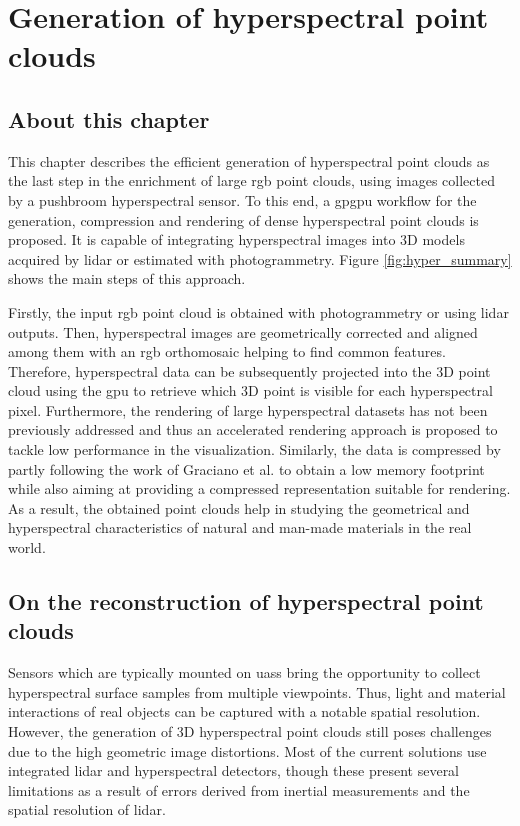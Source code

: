 \setchapterpreamble[u]{\margintoc}
\chapter{Generation of hyperspectral point clouds}
\label{sec:hyperspectral_point_clouds}

\section*{About this chapter}

This chapter describes the efficient generation of hyperspectral point clouds as the last step in the enrichment of large \acrshort{rgb} point clouds, using images collected by a pushbroom hyperspectral sensor. To this end, a \acrshort{gpgpu} workflow for the generation, compression and rendering of dense hyperspectral point clouds is proposed. It is capable of integrating hyperspectral images into 3D models acquired by \acrshort{lidar} or estimated with photogrammetry. Figure \ref{fig:hyper_summary} shows the main steps of this approach.

Firstly, the input \acrshort{rgb} point cloud is obtained with photogrammetry or using \acrshort{lidar} outputs. Then, hyperspectral images are geometrically corrected and aligned among them with an \acrshort{rgb} orthomosaic helping to find common features. Therefore, hyperspectral data can be subsequently projected into the 3D point cloud using the \acrshort{gpu} to retrieve which 3D point is visible for each hyperspectral pixel. Furthermore, the rendering of large hyperspectral datasets has not been previously addressed and thus an accelerated rendering approach is proposed to tackle low performance in the visualization. Similarly, the data is compressed by partly following the work of Graciano et al. \cite{graciano_quadstack_2021} to obtain a low memory footprint while also aiming at providing a compressed representation suitable for rendering. As a result, the obtained point clouds help in studying the geometrical and hyperspectral characteristics of natural and man-made materials in the real world.

\section{On the reconstruction of hyperspectral point clouds}

Sensors which are typically mounted on \acrshort{uas}s bring the opportunity to collect hyperspectral surface samples from multiple viewpoints. Thus, light and material interactions of real objects can be captured with a notable spatial resolution. However, the generation of 3D hyperspectral point clouds still poses challenges due to the high geometric image distortions. Most of the current solutions use integrated \acrshort{lidar} and hyperspectral detectors, though these present several limitations as a result of errors derived from inertial measurements and the spatial resolution of \acrshort{lidar}. 


